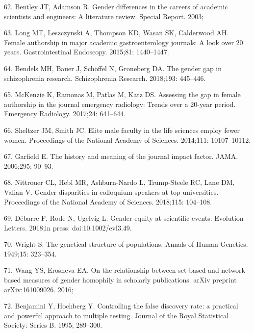 \documentclass[12pt,]{article}
\begin{document}
\leavevmode\hypertarget{ref-Bentley_2003}{}%
62. Bentley JT, Adamson R. Gender differences in the careers of academic
scientists and engineers: A literature review. Special Report. 2003;

\leavevmode\hypertarget{ref-Long_2015}{}%
63. Long MT, Leszczynski A, Thompson KD, Wasan SK, Calderwood AH. Female
authorship in major academic gastroenterology journals: A look over 20
years. Gastrointestinal Endoscopy. 2015;81: 1440--1447.

\leavevmode\hypertarget{ref-Bendels_2018}{}%
64. Bendels MH, Bauer J, Schöffel N, Groneberg DA. The gender gap in
schizophrenia research. Schizophrenia Research. 2018;193: 445--446.

\leavevmode\hypertarget{ref-McKenzie_2017}{}%
65. McKenzie K, Ramonas M, Patlas M, Katz DS. Assessing the gap in
female authorship in the journal emergency radiology: Trends over a
20-year period. Emergency Radiology. 2017;24: 641--644.

\leavevmode\hypertarget{ref-sheltzer_2014}{}%
66. Sheltzer JM, Smith JC. Elite male faculty in the life sciences
employ fewer women. Proceedings of the National Academy of Sciences.
2014;111: 10107--10112.

\leavevmode\hypertarget{ref-Garfield_2006}{}%
67. Garfield E. The history and meaning of the journal impact factor.
JAMA. 2006;295: 90--93.

\leavevmode\hypertarget{ref-nittrouer_2018}{}%
68. Nittrouer CL, Hebl MR, Ashburn-Nardo L, Trump-Steele RC, Lane DM,
Valian V. Gender disparities in colloquium speakers at top universities.
Proceedings of the National Academy of Sciences. 2018;115: 104--108.

\leavevmode\hypertarget{ref-debarre_2018}{}%
69. Débarre F, Rode N, Ugelvig L. Gender equity at scientific events.
Evolution Letters. 2018;in press: doi:10.1002/evl3.49.

\leavevmode\hypertarget{ref-wright_1949}{}%
70. Wright S. The genetical structure of populations. Annals of Human
Genetics. 1949;15: 323--354.

\leavevmode\hypertarget{ref-wang_2016}{}%
71. Wang YS, Erosheva EA. On the relationship between set-based and
network-based measures of gender homophily in scholarly publications.
arXiv preprint arXiv:161009026. 2016;

\leavevmode\hypertarget{ref-Benjamini_1995}{}%
72. Benjamini Y, Hochberg Y. Controlling the false discovery rate: a
practical and powerful approach to multiple testing. Journal of the
Royal Statistical Society: Series B. 1995; 289--300.
\end{document}
